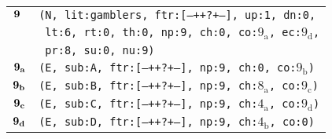 \documentclass{article}
\begin{document}
\begin{minipage}{\textwidth}
{\begin{tabular}{|r|l|}
    ${\textbf{\textrm{9}}_{\phantom{z}}}$ & \texttt{\texttt{(N,~lit:gamblers,~ftr:[---++?+--],~up:1,~dn:0,}} \\
    & \texttt{\texttt{~lt:6,~rt:0,~th:0,~np:9,~ch:0,~co:${\textrm{9}_{\textrm{a}}}$,~ec:${\textrm{9}_{\textrm{d}}}$,}} \\
    & \texttt{\texttt{~pr:8,~su:0,~nu:9)}} \\
    ${\textbf{\textrm{9}}_{\textbf{\textrm{a}}}}$ & \texttt{\texttt{(E,~sub:A,~ftr:[---++?+--],~np:9,~ch:0,~co:${\textrm{9}_{\textrm{b}}}$)}} \\
    ${\textbf{\textrm{9}}_{\textbf{\textrm{b}}}}$ & \texttt{\texttt{(E,~sub:B,~ftr:[---++?+--],~np:9,~ch:${\textrm{8}_{\textrm{a}}}$,~co:${\textrm{9}_{\textrm{c}}}$)}} \\
    ${\textbf{\textrm{9}}_{\textbf{\textrm{c}}}}$ & \texttt{\texttt{(E,~sub:C,~ftr:[---++?+--],~np:9,~ch:${\textrm{4}_{\textrm{a}}}$,~co:${\textrm{9}_{\textrm{d}}}$)}} \\
    ${\textbf{\textrm{9}}_{\textbf{\textrm{d}}}}$ & \texttt{\texttt{(E,~sub:D,~ftr:[---++?+--],~np:9,~ch:${\textrm{4}_{\textrm{b}}}$,~co:0)}} \\
    \hline
  \end{tabular}
  }
\end{minipage}
\bigbreak
\end{document}
